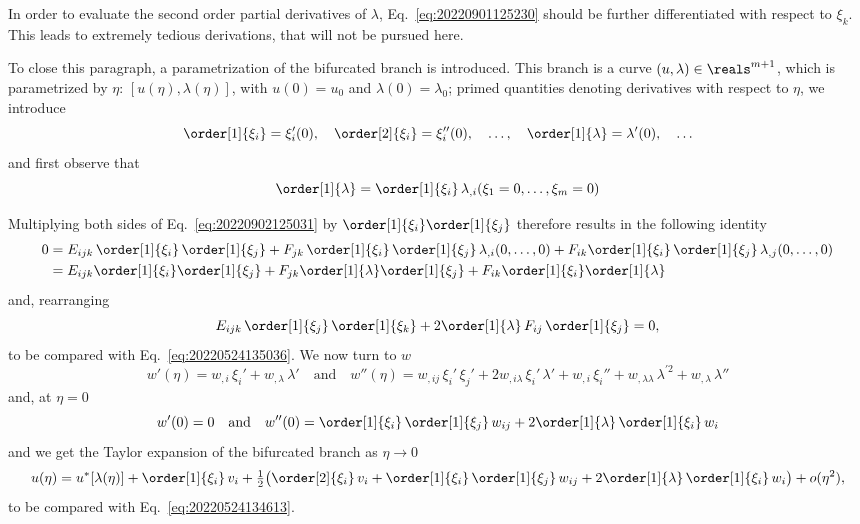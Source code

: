 In order to evaluate the second order partial derivatives of $\lambda$, Eq.~\eqref{eq:20220901125230} should be further
differentiated with respect to $\xi_k$. This leads to extremely tedious derivations, that will not be pursued here.

To close this paragraph, a parametrization of the bifurcated branch is introduced. This branch is a curve
$(u, \lambda) \in \reals ^ {m + 1}$, which is parametrized by $\eta$: $[u(\eta), \lambda(\eta)]$, with $u(0) = u_0$ and
$\lambda(0) = \lambda_0$; primed quantities denoting derivatives with respect to $\eta$, we introduce
\begin{equation}
  \order[1]{\xi_i} = \xi_i'(0), \quad
  \order[2]{\xi_i} = \xi_i''(0), \quad \ldots, \quad
  \order[1]{\lambda} = \lambda'(0), \quad \ldots
\end{equation}
and first observe that
\begin{equation}
  \order[1]{\lambda} = \order[1]{\xi_i} \, \lambda_{,i}(\xi_1 = 0, \ldots, \xi_ m = 0)
\end{equation}

Multiplying both sides of Eq.~\eqref{eq:20220902125031} by $\order[1]{\xi_i} \order[1]{\xi_j}$ therefore results in the
following identity
\begin{equation}
  \begin{aligned}[b]
    0 &= E_{ijk} \, \order[1]{\xi_i} \, \order[1]{\xi_j} +  F_{jk} \, \order[1]{\xi_i} \, \order[1]{\xi_j} \, \lambda_{, i}(0, \ldots, 0) + F_{ik} \order[1]{\xi_i} \, \order[1]{\xi_j} \, \lambda_{, j}(0, \ldots, 0)\\
    &= E_{ijk} \order[1]{\xi_i} \order[1]{\xi_j} +  F_{jk} \order[1]{\lambda} \order[1]{\xi_j} + F_{ik} \order[1]{\xi_i} \order[1]{\lambda}
  \end{aligned}
\end{equation}
and, rearranging
\begin{equation}
  E_{ijk} \, \order[1]{\xi_j} \, \order[1]{\xi_k} +  2 \order[1]{\lambda} \, F_{ij}  \, \order[1]{\xi_j} = 0,
\end{equation}
to be compared with Eq.~\eqref{eq:20220524135036}. We now turn to $w$
\begin{equation}
  w'(\eta) = w_{,i} \, \xi_i' + w_{,\lambda} \, \lambda'
  \quad \text{and} \quad
  w''(\eta) = w_{,ij} \, \xi_i' \, \xi_j' + 2w_{,i\lambda} \, \xi_i' \, \lambda' + w_{,i} \, \xi_i'' + w_{,\lambda\lambda} \, \lambda^{'2} + w_{,\lambda} \, \lambda''
\end{equation}
and, at $\eta = 0$
\begin{equation}
  w'(0) = 0 \quad \text{and} \quad w''(0) = \order[1]{\xi_i} \, \order[1]{\xi_j} \, w_{ij}  + 2 \order[1]{\lambda} \, \order[1]{\xi_i} \, w_i
\end{equation}
and we get the Taylor expansion of the bifurcated branch as $\eta \to 0$
\begin{equation}
  u(\eta) = u^\ast[\lambda(\eta)] + \order[1]{\xi_i} \, v_i + \tfrac{1}{2} \bigl( \order[2]{\xi_i} \, v_i + \order[1]{\xi_i} \, \order[1]{\xi_j} \, w_{ij}  + 2\order[1]{\lambda} \, \order[1]{\xi_i} \, w_i\bigr) + o(\eta^2),
\end{equation}
to be compared with Eq.~\eqref{eq:20220524134613}.

